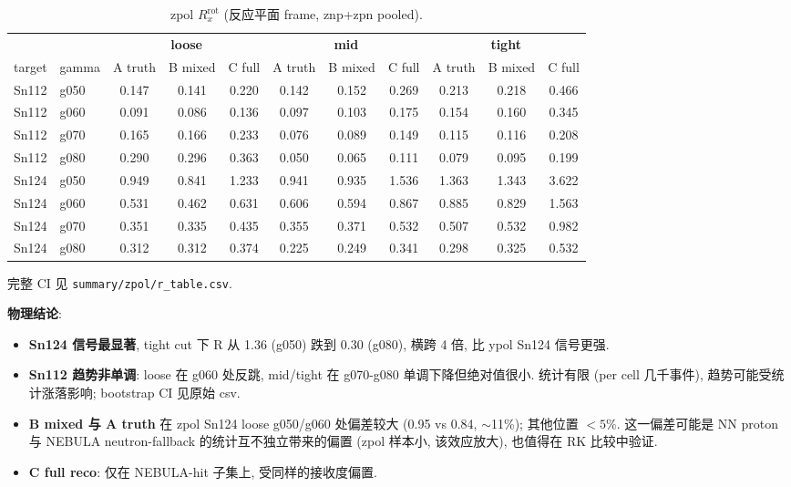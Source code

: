 \documentclass[a4paper,11pt]{article}
\begin{document}
\begin{table}[H]
\centering\scriptsize
\caption{zpol $R_x^\text{rot}$ (反应平面 frame, znp+zpn pooled).}
\begin{tabular}{ll|ccc|ccc|ccc}
\toprule
& & \multicolumn{3}{c|}{\textbf{loose}} & \multicolumn{3}{c|}{\textbf{mid}} & \multicolumn{3}{c}{\textbf{tight}} \\
target & gamma & A truth & B mixed & C full & A truth & B mixed & C full & A truth & B mixed & C full \\
\midrule
Sn112 & g050 & 0.147 & 0.141 & 0.220 & 0.142 & 0.152 & 0.269 & 0.213 & 0.218 & 0.466 \\
Sn112 & g060 & 0.091 & 0.086 & 0.136 & 0.097 & 0.103 & 0.175 & 0.154 & 0.160 & 0.345 \\
Sn112 & g070 & 0.165 & 0.166 & 0.233 & 0.076 & 0.089 & 0.149 & 0.115 & 0.116 & 0.208 \\
Sn112 & g080 & 0.290 & 0.296 & 0.363 & 0.050 & 0.065 & 0.111 & 0.079 & 0.095 & 0.199 \\
Sn124 & g050 & 0.949 & 0.841 & 1.233 & 0.941 & 0.935 & 1.536 & 1.363 & 1.343 & 3.622 \\
Sn124 & g060 & 0.531 & 0.462 & 0.631 & 0.606 & 0.594 & 0.867 & 0.885 & 0.829 & 1.563 \\
Sn124 & g070 & 0.351 & 0.335 & 0.435 & 0.355 & 0.371 & 0.532 & 0.507 & 0.532 & 0.982 \\
Sn124 & g080 & 0.312 & 0.312 & 0.374 & 0.225 & 0.249 & 0.341 & 0.298 & 0.325 & 0.532 \\
\bottomrule
\end{tabular}
\end{table}

完整 CI 见 \texttt{summary/zpol/r\_table.csv}.

\textbf{物理结论}:
\begin{itemize}[nosep]
    \item \textbf{Sn124 信号最显著}, tight cut 下 R 从 1.36 (g050) 跌到 0.30 (g080), 横跨 4 倍, 比 ypol Sn124 信号更强.
    \item \textbf{Sn112 趋势非单调}: loose 在 g060 处反跳, mid/tight 在 g070-g080 单调下降但绝对值很小. 统计有限 (per cell 几千事件), 趋势可能受统计涨落影响; bootstrap CI 见原始 csv.
    \item \textbf{B mixed 与 A truth} 在 zpol Sn124 loose g050/g060 处偏差较大 (0.95 vs 0.84, $\sim$11\%); 其他位置 $<5\%$. 这一偏差可能是 NN proton 与 NEBULA neutron-fallback 的统计互不独立带来的偏置 (zpol 样本小, 该效应放大), 也值得在 RK 比较中验证.
    \item \textbf{C full reco}: 仅在 NEBULA-hit 子集上, 受同样的接收度偏置.
\end{itemize}
\end{document}

